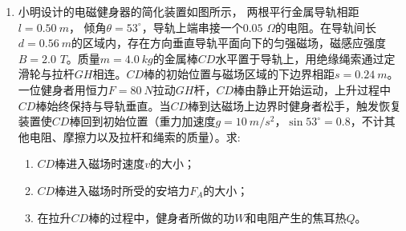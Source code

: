 \begin{enumerate}
\newpage
\item 
{}
小明设计的电磁健身器的简化装置如图所示， 两根平行金属导轨相距$ l=0.50\ m $， 倾角$ \theta =53 ^{ \circ } $，导轨上端串接一个$ 0.05 $ $ \Omega $的电阻。在导轨间长$ d=0.56\ m $的区域内，存在方向垂直导轨平面向下的匀强磁场，磁感应强度$ B=2.0 $ $ T $。质量$ m=4.0 \ kg $的金属棒$ CD $水平置于导轨上，用绝缘绳索通过定滑轮与拉杆$ GH $相连。$ CD $棒的初始位置与磁场区域的下边界相距$ s=0.24\ m $。一位健身者用恒力$ F=80 \ N $拉动$ GH $杆，$ CD $棒由静止开始运动，上升过程中$ CD $棒始终保持与导轨垂直。当$ CD $棒到达磁场上边界时健身者松手，触发恢复装置使$ CD $棒回到初始位置（重力加速度$ g=10 \ m/s^{2} $，$ \sin 53 ^{ \circ } =0.8 $，不计其他电阻、摩擦力以及拉杆和绳索的质量）。求:
\begin{enumerate}
\renewcommand{\labelenumi}{\arabic{enumi}.}
\item
$ CD $棒进入磁场时速度$ v $的大小；
\item 
$ CD $棒进入磁场时所受的安培力$ F_A $的大小；
\item 
在拉升$ CD $棒的过程中，健身者所做的功$ W $和电阻产生的焦耳热$ Q $。


\end{enumerate}
\begin{figure}[h!]
\flushright 

\end{figure}






\end{enumerate}
